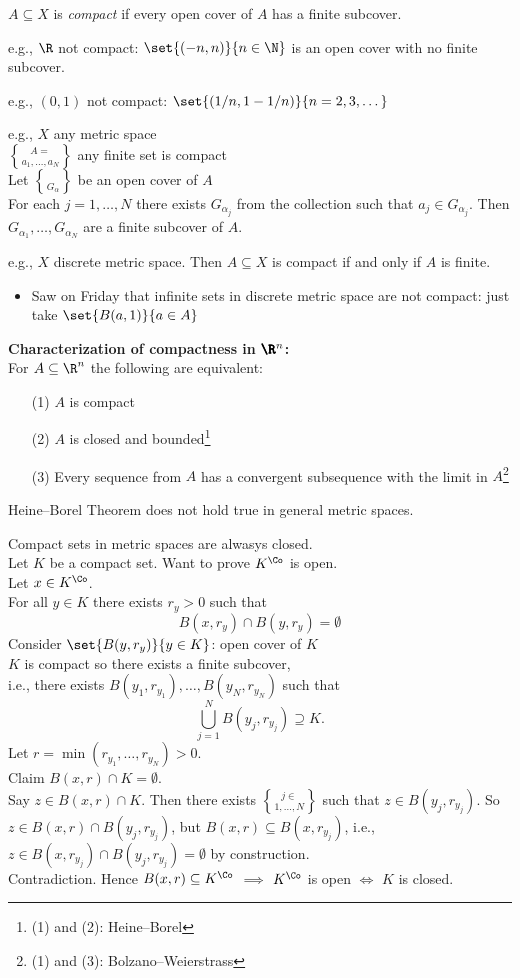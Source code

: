  $A\subseteq X$ is \emph{compact} if every open cover of $A$ has a finite subcover.

e.g., $\R$ not compact: $\set{(-n,n)}{n\in\N}$ is an open cover with no finite subcover.

e.g., $(0,1)$ not compact: $\set{(1/n,1-1/n)}{n=2,3,\dotsc}$

e.g., $X$ any metric space \\
$A=\brace{a_1,\dotsc,a_N}$ any finite set is compact \\
\pf Let $\brace{G_\alpha}$ be an open cover of $A$ \\
For each $j=1,\dotsc,N$ there exists $G_{\alpha_j}$ from the collection such that $a_j\in G_{\alpha_j}$.  Then $G_{\alpha_1},\dotsc,G_{\alpha_N}$ are a finite subcover of $A$.

e.g., $X$ discrete metric space.  Then $A\subseteq X$ is compact if and only if $A$ is finite.
\begin{itemize}
\item Saw on Friday that infinite sets in discrete metric space are not compact: just take $\set{B(a,1)}{a\in A}$
\end{itemize}

\textbf{Characterization of compactness in $\pmb\R^n$:} \\
\thm For $A\subseteq\R^n$ the following are equivalent:
\begin{enumerate}
\item[(1)] $A$ is compact
\item[(2)] $A$ is closed and bounded\footnote{(1) and (2): Heine--Borel}
\item[(3)] Every sequence from $A$ has a convergent subsequence with the limit in $A$\footnote{(1) and (3): Bolzano--Weierstrass}
\end{enumerate}
Heine--Borel Theorem does not hold true in general metric spaces.

\prop Compact sets in metric spaces are alwasys closed. \\
\pf Let $K$ be a compact set.  Want to prove $K^\Co$ is open. \\
Let $x\in K^\Co$. \\
For all $y\in K$ there exists $r_y>0$ such that
\[ B(x,r_y) \cap B(y,r_y) = \emptyset \]
Consider $\set{B(y,r_y)}{y\in K}$: open cover of $K$ \\
$K$ is compact so there exists a finite subcover, \\
i.e., there exists $B(y_1,r_{y_1}),\dotsc,B(y_N,r_{y_N})$ such that
\[ \bigcup_{j=1}^N B(y_j,r_{y_j}) \supseteq K . \]
Let $r=\min(r_{y_1},\dotsc,r_{y_N})>0$. \\
Claim $B(x,r)\cap K=\emptyset$. \\
Say $z\in B(x,r)\cap K$.  Then there exists $j\in\brace{1,\dotsc,N}$ such that $z\in B(y_j,r_{y_j})$.  So $z\in B(x,r)\cap B(y_j,r_{y_j})$, but $B(x,r)\subseteq B(x,r_{y_j})$, i.e., $z\in B(x,r_{y_j})\cap B(y_j,r_{y_j})=\emptyset$ by construction. \\
Contradiction.  Hence $B(x,r)\subseteq K^\Co$ $\implies$ $K^\Co$ is open $\iff$ $K$ is closed.

